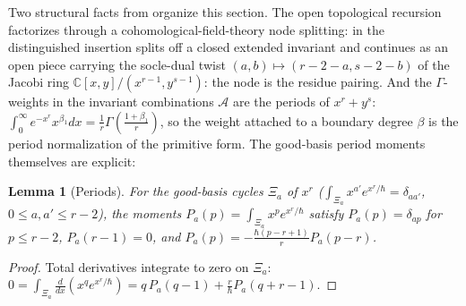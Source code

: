 \documentclass[11pt]{amsart}
\newtheorem{lemma}[theorem]{Lemma}
\theoremstyle{definition}
\theoremstyle{remark}
\newcommand{\CC}{\mathbb{C}}
\newcommand{\Ascr}{\mathcal{A}}
\begin{document}
Two structural facts from \cite{GKT} organize this section. The open
topological recursion factorizes through a
cohomological-field-theory node splitting: in
\cite[Lem.~6.4]{GKT} the distinguished insertion splits off a closed extended
invariant and continues as an open piece carrying the socle-dual twist
$(a,b)\mapsto(r{-}2{-}a,s{-}2{-}b)$ of the Jacobi ring
$\CC[x,y]/(x^{r-1},y^{s-1})$: the node is the residue pairing. And the
$\Gamma$-weights in the invariant combinations $\Ascr$ are the periods of
$x^{r}+y^{s}$: $\int_{0}^{\infty}e^{-x^{r}}x^{\beta_1}dx=\tfrac1r\Gamma(\tfrac{1+\beta_1}r)$,
so the weight attached to a boundary degree $\beta$ is the period normalization of the
primitive form. The good-basis period moments themselves are explicit:

\begin{lemma}[Periods]
\label{lem:periods}
For the good-basis cycles $\Xi_{a}$ of $x^{r}$
($\int_{\Xi_{a}}x^{a'}e^{x^{r}/\hbar}=\delta_{aa'}$, $0\le a,a'\le r-2$), the
moments $P_{a}(p)=\int_{\Xi_{a}}x^{p}e^{x^{r}/\hbar}$ satisfy
$P_{a}(p)=\delta_{ap}$ for $p\le r{-}2$, $P_{a}(r{-}1)=0$, and
$P_{a}(p)=-\tfrac{\hbar(p-r+1)}{r}P_{a}(p-r)$.
\end{lemma}

\begin{proof}
Total derivatives integrate to zero on $\Xi_{a}$:
$0=\int_{\Xi_{a}}\tfrac{d}{dx}(x^{q}e^{x^{r}/\hbar})
=q\,P_{a}(q{-}1)+\tfrac r\hbar P_{a}(q{+}r{-}1)$.
\end{proof}
\end{document}
